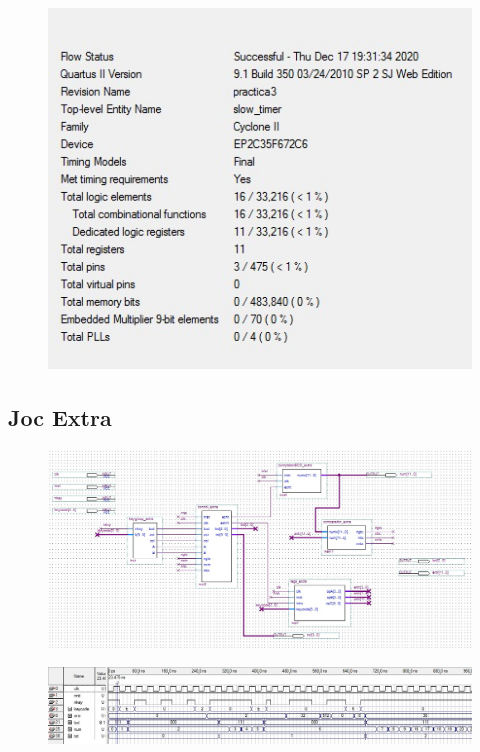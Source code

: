 \documentclass[12pt, a4papre]{article}
\begin{document}
	
		\begin{figure}[H]
			
				\begin{center}
		\includegraphics[width=130mm]{informeSlowTimer.jpeg}
		\end{center}
	\end{figure}
\subsection{Joc Extra}


\begin{figure}[H]
			
				\begin{center}
		\includegraphics[width=130mm]{jocExtra.jpeg}
		\end{center}
	\end{figure}
	
	\begin{figure}[H]
	
				\begin{center}
		\includegraphics[width=130mm]{SimulacioJocExtra.jpeg}
		\end{center}
	\end{figure}
	
\end{document}
